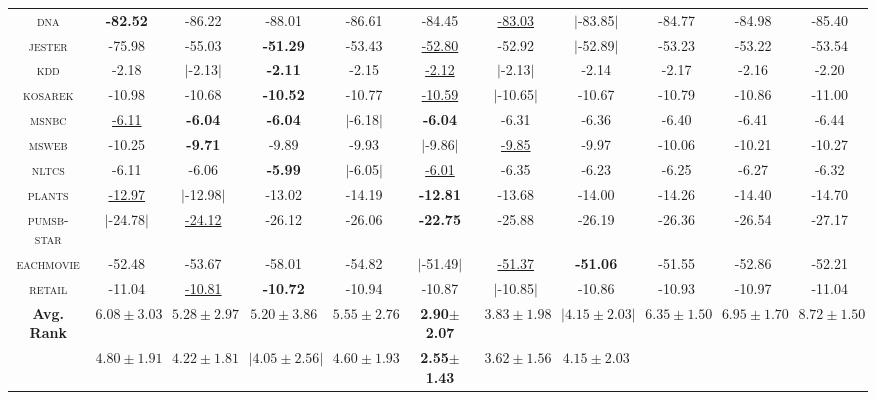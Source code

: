\begin{table}
{\begin{tabular}{c|ccccc|ccccc}
    \textsc{dna       } & \textbf{-82.52} & -86.22 & -88.01 & -86.61 & -84.45 & \underline{-83.03} & $|$-83.85$|$ & -84.77 & -84.98 & -85.40\\
    \textsc{jester    } & -75.98 & -55.03 & \textbf{-51.29} & -53.43 & \underline{-52.80} & -52.92 & $|$-52.89$|$ & -53.23 & -53.22 & -53.54\\
    \textsc{kdd       } & -2.18 & $|$-2.13$|$ & \textbf{-2.11} & -2.15 & \underline{-2.12} & $|$-2.13$|$ & -2.14 & -2.17 & -2.16 & -2.20\\
    \textsc{kosarek   } & -10.98 & -10.68 & \textbf{-10.52} & -10.77 & \underline{-10.59} & $|$-10.65$|$ & -10.67 & -10.79 & -10.86 & -11.00\\
    \textsc{msnbc     } & \underline{-6.11} & \textbf{-6.04} & \textbf{-6.04} & $|$-6.18$|$ & \textbf{-6.04} & -6.31 & -6.36 & -6.40 & -6.41 & -6.44\\
    \textsc{msweb     } & -10.25 & \textbf{-9.71} & -9.89 & -9.93 & $|$-9.86$|$ & \underline{-9.85} & -9.97 & -10.06 & -10.21 & -10.27\\
    \textsc{nltcs     } & -6.11 & -6.06 & \textbf{-5.99} & $|$-6.05$|$ & \underline{-6.01} & -6.35 & -6.23 & -6.25 & -6.27 & -6.32\\
    \textsc{plants    } & \underline{-12.97} & $|$-12.98$|$ & -13.02 & -14.19 & \textbf{-12.81} & -13.68 & -14.00 & -14.26 & -14.40 & -14.70\\
    \textsc{pumsb-star} & $|$-24.78$|$ & \underline{-24.12} & -26.12 & -26.06 & \textbf{-22.75} & -25.88 & -26.19 & -26.36 & -26.54 & -27.17\\
    \textsc{eachmovie } & -52.48 & -53.67 & -58.01 & -54.82 & $|$-51.49$|$ & \underline{-51.37} & \textbf{-51.06} & -51.55 & -52.86 & -52.21\\
    \textsc{retail    } & -11.04 & \underline{-10.81} & \textbf{-10.72} & -10.94 & -10.87 & $|$-10.85$|$ & -10.86 & -10.93 & -10.97 & -11.04\\
    \hline
    \multirow{2}{*}[-0.15em]{\textbf{Avg. Rank}} & $6.08\pm 3.03$ & $5.28\pm 2.97$ & $5.20\pm 3.86$ & $5.55\pm 2.76$ & \textbf{2.90}$\bm{\pm}$\textbf{2.07} & \underline{$3.83\pm 1.98$} & $|4.15\pm 2.03|$ & $6.35\pm 1.50$ & $6.95\pm 1.70$ & $8.72\pm 1.50$ \\
                                                 & $4.80\pm 1.91$ & $4.22\pm 1.81$ & $|4.05\pm 2.56|$ & $4.60\pm 1.93$ & \textbf{2.55}$\bm{\pm}$\textbf{1.43} & \underline{$3.62\pm 1.56$} & $4.15\pm 2.03$ \\
    \hline
  \end{tabular}
}
\end{table}
